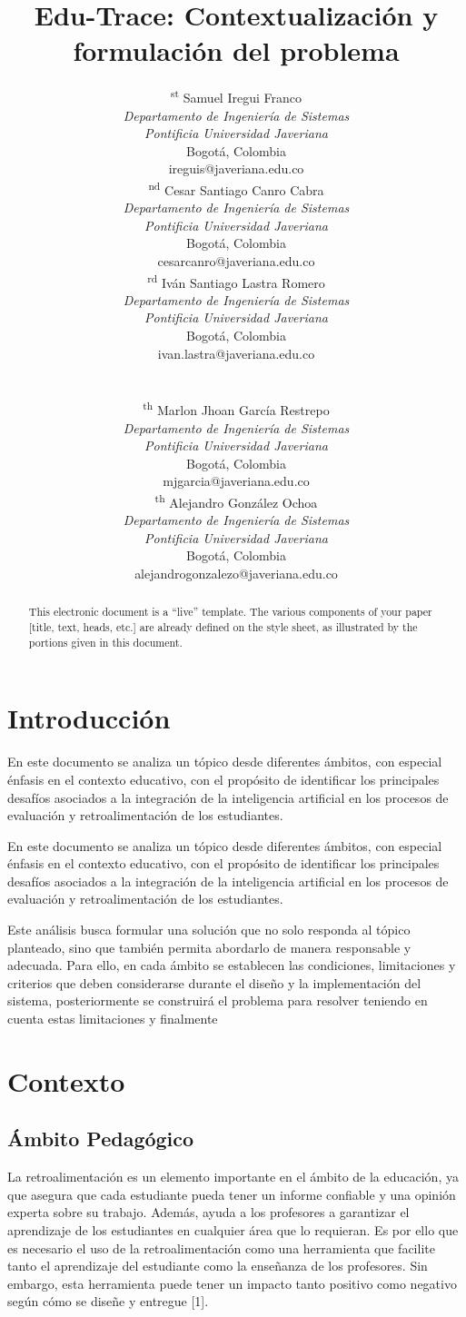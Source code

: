 \documentclass[letterpaper, 10 pt, conference]{ieeeconf}  %
\title{\LARGE \bf
Edu-Trace: Contextualización y formulación del problema
}
\author{
	\parbox{2.0 in}{\centering 1\textsuperscript{st} Samuel Iregui Franco\\
		\footnotesize\textit{Departamento de Ingeniería de Sistemas}\\
		\footnotesize\textit{Pontificia Universidad Javeriana}\\
		 Bogotá, Colombia\\
		{\footnotesize ireguis@javeriana.edu.co}}
	\hspace*{0.1 in}
	\parbox{2.0 in}{\centering 2\textsuperscript{nd} Cesar Santiago Canro Cabra\\
		\footnotesize\textit{Departamento de Ingeniería de Sistemas}\\
		\footnotesize\textit{Pontificia Universidad Javeriana}\\
		\footnotesize Bogotá, Colombia\\
		{\footnotesize cesarcanro@javeriana.edu.co}}
	\hspace*{0.1 in}
	\parbox{2.1 in}{\centering 3\textsuperscript{rd} Iván Santiago Lastra Romero\\
		\footnotesize\textit{Departamento de Ingeniería de Sistemas}\\
		\footnotesize\textit{Pontificia Universidad Javeriana}\\
		Bogotá, Colombia\\
		{\footnotesize ivan.lastra@javeriana.edu.co}}
	\hspace*{0.1 in}
	\\[0.2 in] %
	\parbox{2.2 in}{\centering 4\textsuperscript{th} Marlon Jhoan García Restrepo\\
		\footnotesize\textit{Departamento de Ingeniería de Sistemas}\\
		\footnotesize\textit{Pontificia Universidad Javeriana}\\
		Bogotá, Colombia\\
		{\footnotesize mjgarcia@javeriana.edu.co}}
	\hspace*{0.2 in}
	\parbox{2.0 in}{\centering 5\textsuperscript{th} Alejandro González Ochoa\\
		\footnotesize\textit{Departamento de Ingeniería de Sistemas}\\
		\footnotesize\textit{Pontificia Universidad Javeriana}\\
		Bogotá, Colombia\\
		{\footnotesize alejandrogonzalezo@javeriana.edu.co}}
	\hspace*{0.2 in}
}
\begin{document}
\maketitle
\thispagestyle{empty}
\pagestyle{empty}


\begin{abstract}

This electronic document is a ``live'' template. The various components of your paper [title, text, heads, etc.] are already defined on the style sheet, as illustrated by the portions given in this document.

\end{abstract}



\section{Introducción}

En este documento se analiza un tópico desde diferentes ámbitos, con especial énfasis en el contexto educativo, con el propósito de identificar los principales desafíos asociados a la integración de la inteligencia artificial en los procesos de evaluación y retroalimentación de los estudiantes.

En este documento se analiza un tópico desde diferentes ámbitos, con especial énfasis en el contexto educativo, con el propósito de identificar los principales desafíos asociados a la integración de la inteligencia artificial en los procesos de evaluación y retroalimentación de los estudiantes.

Este análisis busca formular una solución que no solo responda al tópico planteado, sino que también permita abordarlo de manera responsable y adecuada. Para ello, en cada ámbito se establecen las condiciones, limitaciones y criterios que deben considerarse durante el diseño y la implementación del sistema, posteriormente se construirá el problema para resolver teniendo en cuenta estas limitaciones y finalmente

\section{Contexto}

    \subsection{Ámbito Pedagógico}
    La retroalimentación es un elemento importante en el ámbito de la educación, ya que asegura que cada estudiante pueda tener un informe confiable y una opinión experta sobre su trabajo. Además, ayuda a los profesores a garantizar el aprendizaje de los estudiantes en cualquier área que lo requieran. Es por ello que es necesario el uso de la retroalimentación como una herramienta que facilite tanto el aprendizaje del estudiante como la enseñanza de los profesores. Sin embargo, esta herramienta puede tener un impacto tanto positivo como negativo según cómo se diseñe y entregue [1].
\end{document}
